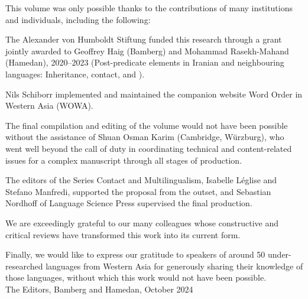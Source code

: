 \addchap{\lsAcknowledgementTitle} 

This volume was only possible thanks to the contributions of many institutions and individuals, including the following:

The Alexander von Humboldt Stiftung funded this research through a grant jointly awarded to Geoffrey Haig (Bamberg) and Mohammad Rasekh-Mahand (Hamedan), 2020--2023 (Post-predicate elements in Iranian and neighbouring languages: Inheritance, contact, and ).

Nils Schiborr implemented and maintained the companion website Word Order in Western Asia (WOWA).

The final compilation and editing of the volume would not have been possible without the assistance of Shuan Osman Karim (Cambridge, Würzburg), who went well beyond the call of duty in coordinating technical and content-related issues for a complex manuscript through all stages of production.

The editors of the Series Contact and Multilingualism, Isabelle Léglise and Stefano Manfredi, supported the proposal from the outset, and Sebastian Nordhoff of Language Science Press supervised the final production.

We are exceedingly grateful to our many colleagues whose constructive and critical reviews have transformed this work into its current form.

Finally, we would like to express our gratitude to speakers of around 50 under-researched languages from Western Asia for generously sharing their knowledge of those languages, without which this work would not have been possible. \\

The Editors, Bamberg and Hamedan, October 2024